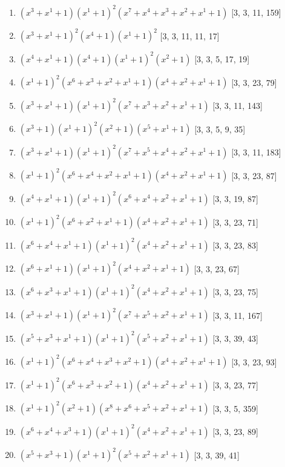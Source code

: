 \documentclass[10pt,twocolumn]{article}
\begin{document}
\begin{enumerate}
\item $(x^{3} + x^{1} + 1)(x^{1} + 1)^{2}(x^{7} + x^{4} + x^{3} + x^{2} + x^{1} + 1)$  [3, 3, 11, 159]
\item $(x^{3} + x^{1} + 1)^{2}(x^{4} + 1)(x^{1} + 1)^{2}$  [3, 3, 11, 11, 17]
\item $(x^{4} + x^{1} + 1)(x^{4} + 1)(x^{1} + 1)^{2}(x^{2} + 1)$  [3, 3, 5, 17, 19]
\item $(x^{1} + 1)^{2}(x^{6} + x^{3} + x^{2} + x^{1} + 1)(x^{4} + x^{2} + x^{1} + 1)$  [3, 3, 23, 79]
\item $(x^{3} + x^{1} + 1)(x^{1} + 1)^{2}(x^{7} + x^{3} + x^{2} + x^{1} + 1)$  [3, 3, 11, 143]
\item $(x^{3} + 1)(x^{1} + 1)^{2}(x^{2} + 1)(x^{5} + x^{1} + 1)$  [3, 3, 5, 9, 35]
\item $(x^{3} + x^{1} + 1)(x^{1} + 1)^{2}(x^{7} + x^{5} + x^{4} + x^{2} + x^{1} + 1)$  [3, 3, 11, 183]
\item $(x^{1} + 1)^{2}(x^{6} + x^{4} + x^{2} + x^{1} + 1)(x^{4} + x^{2} + x^{1} + 1)$  [3, 3, 23, 87]
\item $(x^{4} + x^{1} + 1)(x^{1} + 1)^{2}(x^{6} + x^{4} + x^{2} + x^{1} + 1)$  [3, 3, 19, 87]
\item $(x^{1} + 1)^{2}(x^{6} + x^{2} + x^{1} + 1)(x^{4} + x^{2} + x^{1} + 1)$  [3, 3, 23, 71]
\item $(x^{6} + x^{4} + x^{1} + 1)(x^{1} + 1)^{2}(x^{4} + x^{2} + x^{1} + 1)$  [3, 3, 23, 83]
\item $(x^{6} + x^{1} + 1)(x^{1} + 1)^{2}(x^{4} + x^{2} + x^{1} + 1)$  [3, 3, 23, 67]
\item $(x^{6} + x^{3} + x^{1} + 1)(x^{1} + 1)^{2}(x^{4} + x^{2} + x^{1} + 1)$  [3, 3, 23, 75]
\item $(x^{3} + x^{1} + 1)(x^{1} + 1)^{2}(x^{7} + x^{5} + x^{2} + x^{1} + 1)$  [3, 3, 11, 167]
\item $(x^{5} + x^{3} + x^{1} + 1)(x^{1} + 1)^{2}(x^{5} + x^{2} + x^{1} + 1)$  [3, 3, 39, 43]
\item $(x^{1} + 1)^{2}(x^{6} + x^{4} + x^{3} + x^{2} + 1)(x^{4} + x^{2} + x^{1} + 1)$  [3, 3, 23, 93]
\item $(x^{1} + 1)^{2}(x^{6} + x^{3} + x^{2} + 1)(x^{4} + x^{2} + x^{1} + 1)$  [3, 3, 23, 77]
\item $(x^{1} + 1)^{2}(x^{2} + 1)(x^{8} + x^{6} + x^{5} + x^{2} + x^{1} + 1)$  [3, 3, 5, 359]
\item $(x^{6} + x^{4} + x^{3} + 1)(x^{1} + 1)^{2}(x^{4} + x^{2} + x^{1} + 1)$  [3, 3, 23, 89]
\item $(x^{5} + x^{3} + 1)(x^{1} + 1)^{2}(x^{5} + x^{2} + x^{1} + 1)$  [3, 3, 39, 41]

\end{enumerate}
\end{document}

